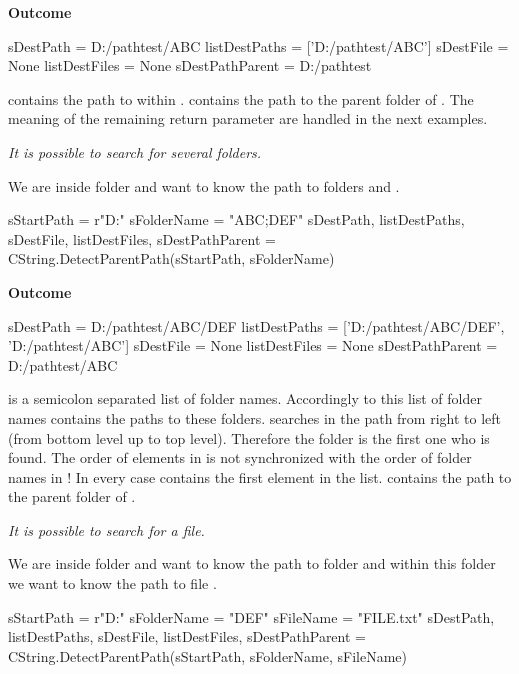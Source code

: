 \textbf{Outcome}

\begin{robotlog}
sDestPath       = D:/pathtest/ABC
listDestPaths   = ['D:/pathtest/ABC']
sDestFile       = None
listDestFiles   = None
sDestPathParent = D:/pathtest
\end{robotlog}

 contains the path to  within .
 contains the path to the parent folder of .
The meaning of the remaining return parameter are handled in the next examples.

\textit{It is possible to search for several folders.}

We are inside folder  and want to know the path to folders  and .

\begin{pythoncode}
sStartPath  = r"D:\pathtest\ABC\DEF\GHI"
sFolderName = "ABC;DEF"
sDestPath, listDestPaths, sDestFile, listDestFiles, sDestPathParent = CString.DetectParentPath(sStartPath, sFolderName)
\end{pythoncode}

\textbf{Outcome}

\begin{robotlog}
sDestPath       = D:/pathtest/ABC/DEF
listDestPaths   = ['D:/pathtest/ABC/DEF', 'D:/pathtest/ABC']
sDestFile       = None
listDestFiles   = None
sDestPathParent = D:/pathtest/ABC
\end{robotlog}

 is a semicolon separated list of folder names. Accordingly to this list of folder names 
contains the paths to these folders.  searches in the path from right to left (from bottom level up to top level).
Therefore the folder  is the first one who is found. The order of elements in  is not synchronized
with the order of folder names in !
In every case  contains the first element in the list.
 contains the path to the parent folder of .

\textit{It is possible to search for a file.}

We are inside folder  and want to know the path to folder  and within this folder we want to know the path to file .

\begin{pythoncode}
sStartPath  = r"D:\pathtest\ABC\DEF\GHI"
sFolderName = "DEF"
sFileName   = "FILE.txt"
sDestPath, listDestPaths, sDestFile, listDestFiles, sDestPathParent = CString.DetectParentPath(sStartPath, sFolderName, sFileName)
\end{pythoncode}

